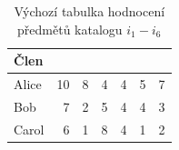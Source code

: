 \documentclass[12pt,a4paper]{report}
\begin{document}
\begin{table}[b!]
    \centering
    \begin{tabular}{l@{\hspace{1.3cm}}D{.}{,}{3.2}D{.}{,}{2.3}D{.}{,}{2.3}D{.}{,}{2.3}D{.}{,}{2.3}D{.}{,}{2.3}}
    \toprule
    \textbf{Člen} &
     &
     &
     &
     &
     &
     \\
    \midrule
    Alice & 10 & 8 & 4 & 4 & 5 & 7 \\
    Bob & 7 & 2 & 5 & 4 & 4 & 3 \\
    Carol & 6 & 1 & 8 & 4 & 1 & 2 \\
    \bottomrule
    \end{tabular}
    \caption{Výchozí tabulka hodnocení předmětů katalogu $i_1-i_6$}\label{tab:ScoresForApendix}
\end{table}
\end{document}
